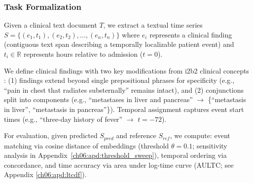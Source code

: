 \subsubsection{Task Formalization}
{\raggedright
Given a clinical text document $T$, we extract a textual time series $S = \{(e_1,t_1), (e_2,t_2),...,(e_n,t_n)\}$ where $e_i$ represents a clinical finding (contiguous text span describing a temporally localizable patient event) and $t_i \in \mathbb{R}$ represents hours relative to admission ($t=0$).\par}

We define clinical findings with two key modifications from i2b2 clinical concepts \citep{ch06:uzuner20112010}: (1) findings extend beyond single prepositional phrases for specificity (e.g., ``pain in chest that radiates substernally'' remains intact), and (2) conjunctions split into components (e.g., ``metastases in liver and pancreas'' $\rightarrow$ \{``metastasis in liver'', ``metastasis in pancreas''\}).
Temporal assignment captures event start times (e.g., ``three-day history of fever'' $\rightarrow$ $t=-72$).

For evaluation, given predicted $S_{pred}$ and reference $S_{ref}$, we compute: event matching via cosine distance of embeddings (threshold $\theta=0.1$; sensitivity analysis in Appendix~\ref{ch06:apd:threshold_sweep}), temporal ordering via concordance, and time accuracy via area under log-time curve (AULTC; see Appendix \ref{ch06:apd:ltcdf}).

